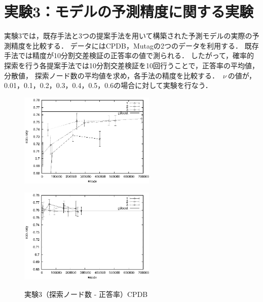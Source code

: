 \section{実験3：モデルの予測精度に関する実験}
実験3では，既存手法と3つの提案手法を用いて構築された予測モデルの実際の予測精度を比較する．
データにはCPDB，Mutagの2つのデータを利用する．
既存手法では精度が10分割交差検証の正答率の値で測られる．
したがって，確率的探索を行う各提案手法では10分割交差検証を10回行うことで，正答率の平均値，分散値，
探索ノード数の平均値を求め，各手法の精度を比較する．
$\ \nu\ $の値が，0.01，0.1，0.2，0.3，0.4，0.5，0.6の場合に対して実験を行なう．
\begin{figure}[t]
	\begin{minipage}{0.5\hsize}
		\begin{center}
			\includegraphics[width=65mm]{cpdb/node_acc.eps}
		\end{center}
		\label{fig:10}
	\end{minipage}
	\begin{minipage}{0.5\hsize}
		\begin{center}
			\includegraphics[width=65mm]{cpdb/node_acc_para.eps}
		\end{center}
		\label{fig:11}
	\end{minipage}
	\caption{実験3（探索ノード数 - 正答率）CPDB}
	\label{cpdb_acc}
\end{figure}
